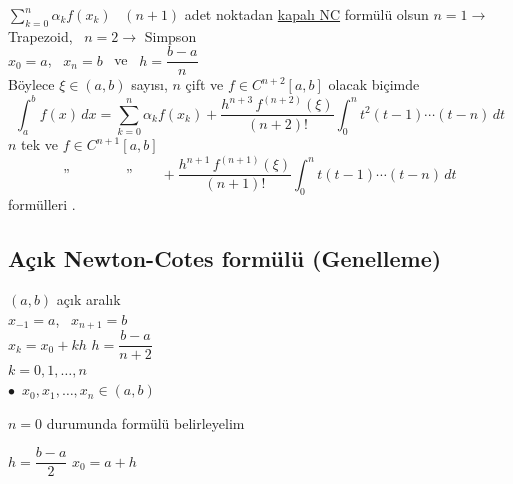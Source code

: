 \documentclass[11pt,a4paper]{article}
\begin{document}
\begin{teorem}
$\displaystyle\sum_{k=0}^{n} \alpha_k f(x_k)$ \ $(n+1)$ adet noktadan \underline{kapalı NC} formülü olsun
\hfill{\small $n = 1 \rightarrow$ Trapezoid, \ $n = 2 \rightarrow$ Simpson}\\
$x_0 = a$, \ $x_n = b$ \ ve \ $h = \dfrac{b-a}{n}$\\
Böylece $\xi \in (a,b)$ sayısı, $n$ çift ve $f \in C^{n+2}[a,b]$ olacak biçimde
\[
  \int_a^b f(x)\,dx = \sum_{k=0}^{n} \alpha_k f(x_k)
  + \frac{h^{n+3}\,f^{(n+2)}(\xi)}{(n+2)!}\int_0^n t^2(t-1)\cdots(t-n)\,dt
\]
\hspace*{0.45\linewidth}$n$ tek ve $f \in C^{n+1}[a,b]$
\[
  \text{''} \qquad\qquad \text{''} \qquad
  + \frac{h^{n+1}\,f^{(n+1)}(\xi)}{(n+1)!}\int_0^n t(t-1)\cdots(t-n)\,dt
\]
formülleri .
\end{teorem}

\subsection{Açık Newton-Cotes formülü (Genelleme)}
\noindent $(a,b)$ açık aralık\\
\hspace*{1em}$x_{-1} = a$, \ $x_{n+1} = b$\\
\hspace*{1em}$x_k = x_0 + kh$ \qquad $h = \dfrac{b-a}{n+2}$\\
\hspace*{6em}$k = 0, 1, \ldots, n$\\[1mm]
\hspace*{1em}$\bullet$\ $x_0, x_1, \ldots, x_n \in (a,b)$
\begin{center}
\end{center}

\noindent $n = 0$ durumunda formülü belirleyelim
\noindent
\begin{minipage}[c]{0.5\linewidth}
$h = \dfrac{b-a}{2}$ \qquad $x_0 = a + h$
\end{minipage}\hfill
\begin{minipage}[c]{0.45\linewidth}
\centering
{}
\end{minipage}
\end{document}

